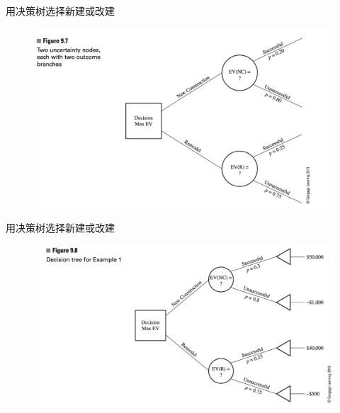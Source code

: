 \documentclass[mathserif, table]{beamer}
\begin{document}
\begin{frame}{用决策树选择新建或改建}
  
  \begin{figure}
    \centering
    \includegraphics[width=\textwidth{}]{9_7.png}
  \end{figure}

\end{frame}

\begin{frame}{用决策树选择新建或改建}
  
  \begin{figure}
    \centering
    \includegraphics[width=\textwidth{}]{9_8.png}
  \end{figure}

\end{frame}
\end{document}
